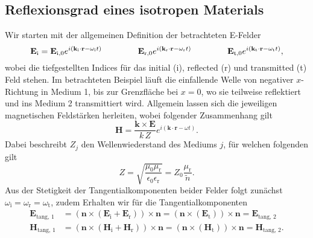 \subsection{\label{subsec:FZV3}Reflexionsgrad eines isotropen Materials}
Wir starten mit der allgemeinen Definition der betrachteten E-Felder
\begin{equation}
    \mathbf{E}_{\text{i}} = \mathbf{E}_{\text{i},0}e^{i\left(\mathbf{k}_{\text{i}}\cdot \mathbf{r}-\omega_{\text{i}} t\right)}
    \hspace{1.5cm}\mathbf{E}_{\text{r},0}e^{i\left(\mathbf{k}_{\text{r}}\cdot \mathbf{r}-\omega_{\text{r}} t\right)}
    \hspace{1.5cm}\mathbf{E}_{\text{t},0}e^{i\left(\mathbf{k}_{\text{t}}\cdot \mathbf{r}-\omega_{\text{t}} t\right)},
\end{equation}
wobei die tiefgestellten Indices für das initial (i), reflected (r) und transmitted (t)
Feld stehen.
Im betrachteten Beispiel läuft die einfallende Welle von negativer $x$-Richtung in Medium 1, bis zur Grenzfläche
bei $x=0$, wo sie teilweise reflektiert und ins Medium 2 transmittiert wird.
Allgemein lassen sich die jeweiligen magnetischen Feldstärken herleiten, wobei folgender
Zusammenhang gilt
\begin{equation}
    \mathbf{H} = \frac{\mathbf{k}\times \mathbf{E}}{k\,Z}e^{i\left(\mathbf{k}\cdot \mathbf{r}-\omega t\right)}.
\end{equation}
Dabei beschreibt $Z_{j}$ den Wellenwiederstand des Mediums $j$, für welchen folgenden gilt
\begin{equation}\label{eq:wellwi}
    Z = \sqrt{\frac{\mu_{0}\mu_{\text{r}}}{\epsilon_{0}\epsilon_{\text{r}}}} = Z_{0}\frac{\mu_{\text{r}}}{\tilde{n}}.
\end{equation}
Aus der Stetigkeit der Tangentialkomponenten beider Felder folgt zunächst
$\omega_{\text{i}} = \omega_{\text{r}} = \omega_{\text{t}}$, zudem Erhalten wir für die Tangentialkomponenten
\begin{align}
    \mathbf{E}_{\text{tang, 1}} & = \left(\mathbf{n}\times\left(\mathbf{E}_{\text{i}} + \mathbf{E}_{\text{r}}\right)\right)\times \mathbf{n}
    = \left(\mathbf{n}\times\left(\mathbf{E}_{\text{t}}\right)\right)\times \mathbf{n} = \mathbf{E}_{\text{tang, 2}} \label{eq:stet1}        \\
    \mathbf{H}_{\text{tang, 1}} & = \left(\mathbf{n}\times\left(\mathbf{H}_{\text{i}} + \mathbf{H}_{\text{r}}\right)\right)\times \mathbf{n}
    = \left(\mathbf{n}\times\left(\mathbf{H}_{\text{t}}\right)\right)\times \mathbf{n} = \mathbf{H}_{\text{tang, 2}}. \label{eq:stet2}
\end{align}

